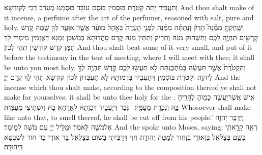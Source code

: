 {וְתַעֲבֵיד יָתַהּ קְטֹרֶת בּוּסְמִין בּוּסֶם עוֹבָד בּוּסְמָנוּ מְעָרַב דְּכֵי לְקוּדְשָׁא׃}
{And thou shalt make of it incense, a perfume after the art of the perfumer, seasoned with salt, pure and holy.}{}
{וְשָֽׁחַקְתָּ֣ מִמֶּ֘נָּה֮ הָדֵק֒ וְנָתַתָּ֨ה מִמֶּ֜נָּה לִפְנֵ֤י הָעֵדֻת֙ בְּאֹ֣הֶל מוֹעֵ֔ד אֲשֶׁ֛ר אִוָּעֵ֥ד לְךָ֖ שָׁ֑מָּה קֹ֥דֶשׁ קׇֽדָשִׁ֖ים תִּהְיֶ֥ה לָכֶֽם׃}
{וְתִשְׁחוֹק מִנַּהּ וְתַדֵּיק וְתִתֵּין מִנַּהּ קֳדָם סָהֲדוּתָא בְּמַשְׁכַּן זִמְנָא דַּאֲזָמֵין מֵימְרִי לָךְ תַּמָּן קֹדֶשׁ קוּדְשִׁין תְּהֵי לְכוֹן׃}
{And thou shalt beat some of it very small, and put of it before the testimony in the tent of meeting, where I will meet with thee; it shall be unto you most holy.}{}
{וְהַקְּטֹ֙רֶת֙ אֲשֶׁ֣ר תַּעֲשֶׂ֔ה בְּמַ֨תְכֻּנְתָּ֔הּ לֹ֥א תַעֲשׂ֖וּ לָכֶ֑ם קֹ֛דֶשׁ תִּהְיֶ֥ה לְךָ֖ לַיהֹוָֽה׃}
{וּקְטֹרֶת בּוּסְמִין דְּתַעֲבֵיד בִּדְמוּתַהּ לָא תַעְבְּדוּן לְכוֹן קוּדְשָׁא תְּהֵי לָךְ קֳדָם יְיָ׃}
{And the incense which thou shalt make, according to the composition thereof ye shall not make for yourselves; it shall be unto thee holy for the \lord.}{}
{אִ֛ישׁ אֲשֶׁר\maqqaf יַעֲשֶׂ֥ה כָמ֖וֹהָ לְהָרִ֣יחַ בָּ֑הּ וְנִכְרַ֖ת מֵעַמָּֽיו׃ \setuma }
{גְּבַר דְּיַעֲבֵיד דִּכְוָתַהּ לְאָרָחָא בַהּ וְיִשְׁתֵּיצֵי מֵעַמֵּיהּ׃}
{Whosoever shall make like unto that, to smell thereof, he shall be cut off from his people.’}{}
\newperek
{}
{וַיְדַבֵּ֥ר יְהֹוָ֖ה אֶל\maqqaf מֹשֶׁ֥ה לֵּאמֹֽר׃}
{וּמַלֵּיל יְיָ עִם מֹשֶׁה לְמֵימַר׃}
{And the \lord\space spoke unto Moses, saying:}{}
{רְאֵ֖ה קָרָ֣אתִֽי בְשֵׁ֑ם בְּצַלְאֵ֛ל בֶּן\maqqaf אוּרִ֥י בֶן\maqqaf ח֖וּר לְמַטֵּ֥ה יְהוּדָֽה׃}
{חֲזִי דְּרַבִּיתִי בְשׁוֹם בְּצַלְאֵל בַּר אוּרִי בַר חוּר לְשִׁבְטָא דִּיהוּדָה׃}
